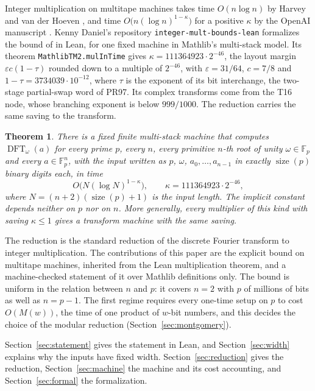 \documentclass[11pt]{amsart}
\newtheorem*{theoremA}{Theorem}
\newcommand{\F}{\mathbb{F}}
\newcommand{\size}{\operatorname{size}}
\newcommand{\DFT}{\operatorname{DFT}}
\newcommand{\lean}[1]{\texttt{#1}}
\begin{document}
Integer multiplication on multitape machines takes time $O(n \log n)$ by Harvey and van der
Hoeven \cite{HvdH}, and time $O\bigl(n (\log n)^{1-\kappa}\bigr)$ for a positive $\kappa$ by
the OpenAI manuscript \cite{OAI}. Kenny Daniel's repository \texttt{integer-mult-bounds-lean}
\cite{IMB} formalizes the bound of \cite{OAI} in Lean, for one fixed machine in Mathlib's
multi-stack model. Its theorem \lean{MathlibTM2.mulInTime} gives
$\kappa = 111364923 \cdot 2^{-46}$, the layout margin $\varepsilon c (1-\tau)$ rounded down to
a multiple of $2^{-46}$, with $\varepsilon = 31/64$, $c = 7/8$ and $1 - \tau = 3734039 \cdot
10^{-12}$, where $\tau$ is the exponent of its bit interchange, the two-stage partial-swap word of
PR97. Its complex transforms come from the T16
node, whose branching exponent is below $999/1000$. The reduction carries the same saving to the
transform.

\begin{theoremA}
There is a fixed finite multi-stack machine that computes $\DFT_\omega(a)$ for every prime $p$,
every $n$, every primitive $n$-th root of unity $\omega \in \F_p$ and every $a \in \F_p^n$, with
the input written as $p$, $\omega$, $a_0, \dots, a_{n-1}$ in exactly $\size(p)$ binary digits
each, in time
\[
  O\bigl(N (\log N)^{1-\kappa}\bigr), \qquad \kappa = 111364923 \cdot 2^{-46},
\]
where $N = (n+2)(\size(p)+1)$ is the input length. The implicit constant depends neither on $p$
nor on $n$. More generally, every multiplier of this kind with saving $\kappa \le 1$ gives a
transform machine with the same saving.
\end{theoremA}

The reduction is the standard reduction of the discrete Fourier transform to integer
multiplication. The contributions of this paper are the explicit bound on multitape machines,
inherited from the Lean multiplication theorem, and a machine-checked statement of it over
Mathlib definitions only. The bound is uniform in the relation between $n$ and $p$: it covers
$n = 2$ with $p$ of millions of bits as well as $n = p - 1$. The first regime requires every
one-time setup on $p$ to cost $O(M(w))$, the time of one product of $w$-bit numbers, and this
decides the choice of the modular reduction (Section~\ref{sec:montgomery}).

Section~\ref{sec:statement} gives the statement in Lean, and Section~\ref{sec:width} explains
why the inputs have fixed width. Section~\ref{sec:reduction} gives the reduction,
Section~\ref{sec:machine} the machine and its cost accounting, and Section~\ref{sec:formal}
the formalization.
\end{document}
